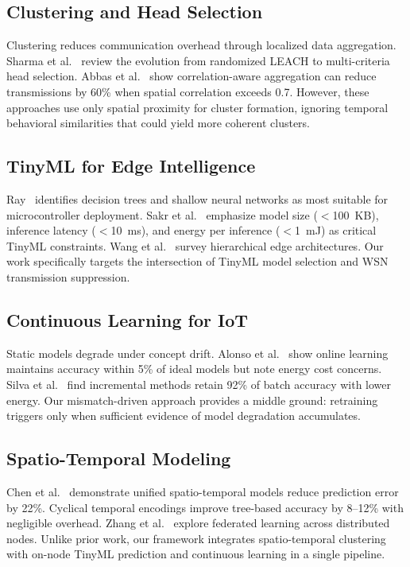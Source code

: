 \documentclass[conference]{IEEEtran}
\begin{document}
\subsection{Clustering and Head Selection}

Clustering reduces communication overhead through localized data aggregation. Sharma et al.~\cite{Sharma2024ClusteringWSN} review the evolution from randomized LEACH to multi-criteria head selection. Abbas et al.~\cite{Abbas2023EnergyAwareClustering} show correlation-aware aggregation can reduce transmissions by 60\% when spatial correlation exceeds 0.7. However, these approaches use only spatial proximity for cluster formation, ignoring temporal behavioral similarities that could yield more coherent clusters.

\subsection{TinyML for Edge Intelligence}

Ray~\cite{Ray2022TinyMLDeployment} identifies decision trees and shallow neural networks as most suitable for microcontroller deployment. Sakr et al.~\cite{Sakr2024TinyMLApplications} emphasize model size ($<$100~KB), inference latency ($<$10~ms), and energy per inference ($<$1~mJ) as critical TinyML constraints. Wang et al.~\cite{Wang2023EdgeAI} survey hierarchical edge architectures. Our work specifically targets the intersection of TinyML model selection and WSN transmission suppression.

\subsection{Continuous Learning for IoT}

Static models degrade under concept drift. Alonso et al.~\cite{Alonso2024OnlineLearning} show online learning maintains accuracy within 5\% of ideal models but note energy cost concerns. Silva et al.~\cite{Silva2023IncrementalML} find incremental methods retain 92\% of batch accuracy with lower energy. Our mismatch-driven approach provides a middle ground: retraining triggers only when sufficient evidence of model degradation accumulates.

\subsection{Spatio-Temporal Modeling}

Chen et al.~\cite{Chen2023SpatioTemporal} demonstrate unified spatio-temporal models reduce prediction error by 22\%. Cyclical temporal encodings improve tree-based accuracy by 8--12\% with negligible overhead. Zhang et al.~\cite{Zhang2024FederatedEdge} explore federated learning across distributed nodes. Unlike prior work, our framework integrates spatio-temporal clustering with on-node TinyML prediction and continuous learning in a single pipeline.
\end{document}
